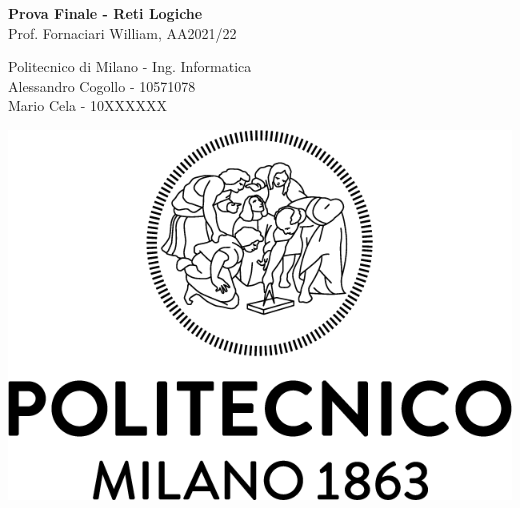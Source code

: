 \documentclass{article}
\begin{document}
\begin{titlepage}
	\begin{center}
		\vspace*{2cm}
		
		\Huge
		\textbf{Prova Finale - Reti Logiche}
		\vspace{0.5cm}
		\LARGE
		\\ Prof. Fornaciari William, AA2021/22
		
		\vspace{1.5cm}
		
		\vfill
		
		\vspace{0.8cm}
		
		\Large
		Politecnico di Milano - Ing. Informatica \\
		Alessandro Cogollo - 10571078\\
		Mario Cela - 10XXXXXX
		
		\vspace{2cm}
		
		\includegraphics[scale=0.25]{images/logo}
		\vspace{1.5cm}		
	\end{center}
\end{titlepage}
\end{document}
